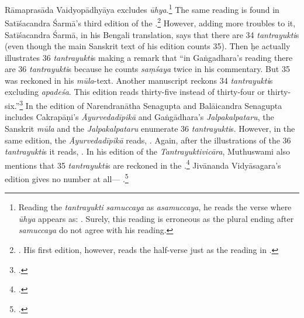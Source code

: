 Rāmaprasāda Vaidyopādhyāya excludes \emph{ūhya}.\footnote{Reading the \emph{tantrayukti} \emph{samuccaya} as \emph{asamuccaya}, he reads the verse where \emph{ūhya} appears as: 
	. Surely, this reading is erroneous as the plural ending after \emph{samuccaya} do not agree with his reading.} 
The same reading is found in Satīśacandra Śarmā's third edition of the \CS.\footnote{\cite[1020]{sarm-1923}. His first edition, however, reads the half-verse just as the reading in \cite{cara-trikamji}.\parencite[884]{sarm-1904}}
However, adding more troubles to it, Satīśacandra Śarmā, in his Bengali translation, says that there are 34 \emph{tantrayukti}s (even though the main Sanskrit text of his edition counts 35). Then ḥe actually illustrates 36 \emph{tantrayukti}s making a remark that “in Gaṅgadhara's reading there are 36 \emph{tantrayukti}s because he counts \emph{saṃśaya} twice in his commentary. But 35 was reckoned in his \emph{mūla}-text. Another manuscript reckons 34 \emph{tantrayukti}s excluding \emph{apadeśa}. This edition reads thirty-five instead of thirty-four or thirty-six.”\footnote{ \cite[1022]{sarm-1923}.} 
In the edition of Narendranātha Senagupta and Balāicandra Senagupta includes Cakrapāṇi's \emph{Āyurvedadīpikā} and Gaṅgādhara's \emph{Jalpakalpataru}, the Sanskrit \emph{mūla} and the \emph{Jalpakalpataru} enumerate 36 \emph{tantrayukti}s. However, in the same edition, the \emph{Āyurvedadīpikā} reads, . 
Again, after the illustrations of the 36 \emph{tantrayukti}s it reads, . 
In his edition of the \emph{Tantrayuktivicāra}, Muthuswami also mentions that 35 \emph{tantrayukti}s are reckoned in the \CS.\footnote{\parencite[fn.2][2]{muth-1976}.} 
Jivānanda Vidyāsagara's edition gives no number at all--- .\footcite[961]{bhat-1877} 

